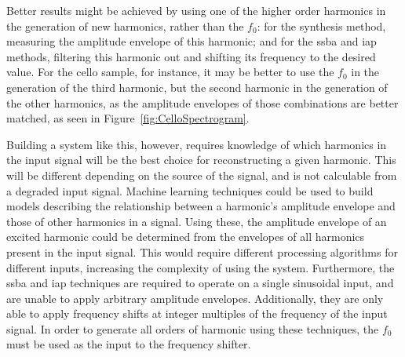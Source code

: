 			Better results might be achieved by using one of the higher order harmonics in the generation of
			new harmonics, rather than the $f_{0}$: for the synthesis method, measuring the amplitude envelope
			of this harmonic; and for the \acrshort{ssba} and \acrshort{iap} methods, filtering this harmonic
			out and shifting its frequency to the desired value. For the cello sample, for instance, it may be
			better to use the $f_{0}$ in the generation of the third harmonic, but the second harmonic in the
			generation of the other harmonics, as the amplitude envelopes of those combinations are better
			matched, as seen in Figure~\ref{fig:CelloSpectrogram}. 
			
			Building a system like this, however, requires knowledge of which harmonics in the input signal
			will be the best choice for reconstructing a given harmonic.  This will be different depending on
			the source of the signal, and is not calculable from a degraded input signal.  Machine learning
			techniques could be used to build models describing the relationship between a harmonic's amplitude
			envelope and those of other harmonics in a signal.  Using these, the amplitude envelope of an
			excited harmonic could be determined from the envelopes of all harmonics present in the input
			signal. This would require different processing algorithms for different inputs, increasing the
			complexity of using the system. Furthermore, the \acrshort{ssba} and \acrshort{iap} techniques are
			required to operate on a single sinusoidal input, and are unable to apply arbitrary amplitude
			envelopes. Additionally, they are only able to apply frequency shifts at integer multiples of the
			frequency of the input signal.  In order to generate all orders of harmonic using these techniques,
			the $f_{0}$ must be used as the input to the frequency shifter.

